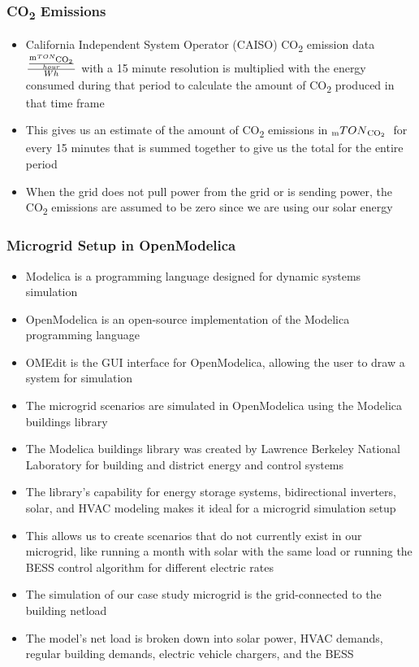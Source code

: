 \documentclass[aspectratio=169, 8 pt]{beamer}
\begin{document}
	\begin{frame}
		\frametitle{CO\textsubscript{2} Emissions}
		\begin{itemize} \Large
			\item California Independent System Operator (CAISO) CO\textsubscript{2} emission data $\frac{\frac{\textsubscript{m}TON\textsubscript{CO\textsubscript{2}}}{hour}}{Wh}$ with a 15 minute resolution is multiplied with the energy consumed during that period to calculate the amount of CO\textsubscript{2} produced in that time frame
			\item  This gives us an estimate of the amount of CO\textsubscript{2} emissions in $\textsubscript{m}TON\textsubscript{CO\textsubscript{2} } $ for every 15 minutes that is summed together to give us the total for the entire period
			\item When the grid does not pull power from the grid or is sending power, the CO\textsubscript{2} emissions are assumed to be
			zero since we are using our solar energy
		\end{itemize}

	\end{frame}

	\begin{frame}
		\frametitle{Microgrid Setup in OpenModelica}
		\begin{itemize} \large
			\item Modelica is a programming language designed for dynamic systems simulation
			\item OpenModelica is an open-source implementation of the Modelica programming language
			\item OMEdit is the GUI interface for OpenModelica, allowing the user to draw a system for simulation
			\item The microgrid scenarios are simulated in OpenModelica using the Modelica buildings library
			\item The Modelica buildings library was created by Lawrence Berkeley National Laboratory for building and district energy and control systems
			\item The library's capability for energy storage systems, bidirectional inverters, solar, and HVAC modeling makes it ideal for a microgrid simulation setup
			\item This allows us to create scenarios that do not currently exist in our microgrid, like running a month with solar with the same load or running the BESS control algorithm for different electric rates
			\item The simulation of our case study microgrid is the grid-connected to the building netload
			\item The model's net load is broken down into solar power, HVAC demands, regular building demands, electric vehicle chargers, and the BESS
		\end{itemize}
	\end{frame}
	
\end{document}

